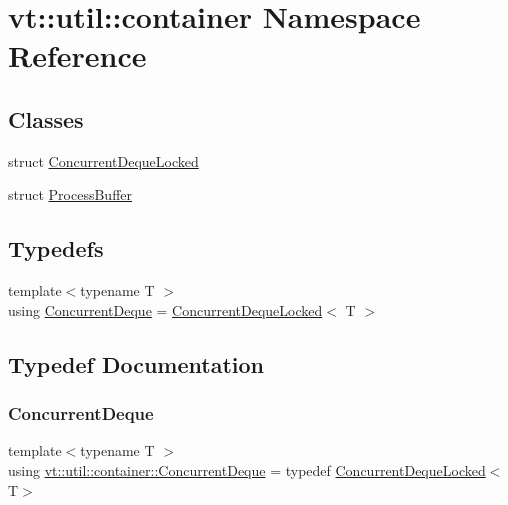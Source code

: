 \hypertarget{namespacevt_1_1util_1_1container}{}\section{vt\+:\+:util\+:\+:container Namespace Reference}
\label{namespacevt_1_1util_1_1container}
\subsection*{Classes}
\begin{DoxyCompactItemize}
\item 
struct \hyperlink{structvt_1_1util_1_1container_1_1_concurrent_deque_locked}{Concurrent\+Deque\+Locked}
\item 
struct \hyperlink{structvt_1_1util_1_1container_1_1_process_buffer}{Process\+Buffer}
\end{DoxyCompactItemize}
\subsection*{Typedefs}
\begin{DoxyCompactItemize}
\item 
{\footnotesize template$<$typename T $>$ }\\using \hyperlink{namespacevt_1_1util_1_1container_a495a137e297e892f4e474d4aaad77c8a}{Concurrent\+Deque} = \hyperlink{structvt_1_1util_1_1container_1_1_concurrent_deque_locked}{Concurrent\+Deque\+Locked}$<$ T $>$
\end{DoxyCompactItemize}


\subsection{Typedef Documentation}
\mbox{\label{namespacevt_1_1util_1_1container_a495a137e297e892f4e474d4aaad77c8a}} 
\subsubsection{\texorpdfstring{Concurrent\+Deque}{ConcurrentDeque}}
{\footnotesize\ttfamily template$<$typename T $>$ \\
using \hyperlink{namespacevt_1_1util_1_1container_a495a137e297e892f4e474d4aaad77c8a}{vt\+::util\+::container\+::\+Concurrent\+Deque} = typedef \hyperlink{structvt_1_1util_1_1container_1_1_concurrent_deque_locked}{Concurrent\+Deque\+Locked}$<$T$>$}

